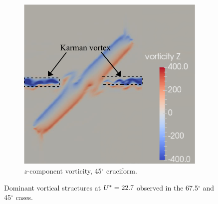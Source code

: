 \documentclass[oneside]{utmthesis}
\begin{document}
\begin{figure}
  \begin{subfigure}[h]{0.6\textwidth}
    \centering
    \includegraphics[width=\textwidth]{figs/vorz45}
    \caption{$z$-component vorticity, 45$^{\circ}$ cruciform.}
    \label{fig:vorz45}
  \end{subfigure}
  \caption{Dominant vortical structures at $U^{*} = 22.7$ observed in the 67.5$^{\circ}$ and 45$^{\circ}$ cases.} \label{fig:vortStruct67545}
\end{figure}
\end{document}
